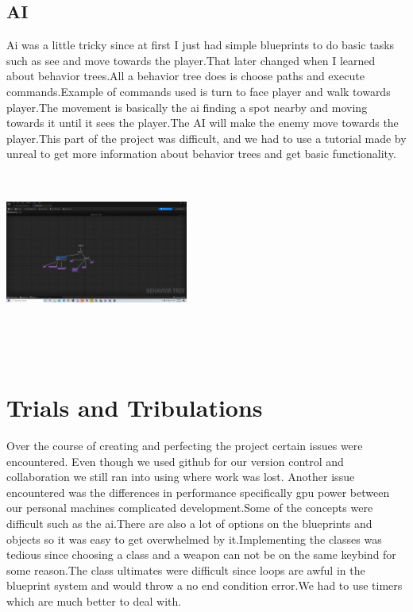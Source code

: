 \documentclass{sigchi}
\begin{document}
\subsection{AI}
Ai was a little tricky since at first I just had simple blueprints to do basic tasks such as see and move towards the player.That later changed when I learned about behavior trees.All a behavior tree does is choose paths and execute commands.Example of commands used is turn to face player and walk towards player.The movement is basically  the ai finding a spot nearby and moving towards it until it sees the player.The AI will make the enemy move towards the player.This part of the project was difficult, and we had to use a tutorial made by unreal to get more information about behavior trees and get basic functionality. \\ 
\includegraphics[width=6cm, height=6cm]{Figure/AI.png} \\ \\  

\section{Trials and Tribulations}
Over the course of creating and perfecting the project certain issues were encountered. Even though we used github for our version control and collaboration we still ran into using where work was lost. Another issue encountered was the differences in performance specifically gpu power between our personal machines complicated development.Some of the concepts were difficult such as the ai.There are also a lot of options on the blueprints and objects  so it was easy to get overwhelmed by it.Implementing the classes was tedious since choosing a class and a weapon can not be on the same keybind for some reason.The class ultimates were difficult since loops are awful in the blueprint system and would throw a no end condition error.We had to use timers which are much better to deal with. 
\end{document}
